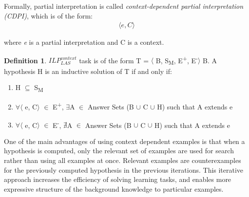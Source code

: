 \documentclass[11pt,twoside]{report}
\theoremstyle{plain}
\theoremstyle{definition}
\newtheorem{defn}[thm]{Definition} %
\begin{document}
Formally, partial interpretation is called \textit{context-dependent partial interpretation (CDPI)}, which is of the form:
\begin{equation} \label{eq:cdpi}
\begin{split}
\langle e, C \rangle
\end{split}
\end{equation}

where \textit{e} is a partial interpretation and C is a context.

%
\begin{defn} \label{def:las_context}
$ILP_{LAS}^{context}$ task is of the form T = $\langle$ B, S\textsubscript{M}, E\textsuperscript{+}, E\textsuperscript{-}$\rangle$ B.
A hypothesis H is an inductive solution of T if and only if:
\begin{enumerate}
\item H $\subseteq$ S\textsubscript{M}
\item $\forall$$\langle$ e, C$\rangle$ $\in$ E\textsuperscript{+}, $\exists$A $\in$ Answer Sets (B $\cup$ C $\cup$ H) such that A extends e
\item $\forall$$\langle$ e, C$\rangle$ $\in$ E\textsuperscript{-}, $\nexists$A $\in$ Answer Sets (B $\cup$ C $\cup$ H) such that A extends e
\end{enumerate}
\end{defn}
One of the main advantages of using context dependent examples is that when a hypothesis is computed, only the relevant set of examples are used for search rather than using all examples at once. 
Relevant examples are counterexamples for the previously computed hypothesis in the previous iterations. This iterative approach increases the efficiency of solving learning tasks, and enables more expressive structure of the background knowledge to particular examples. 
\end{document}
